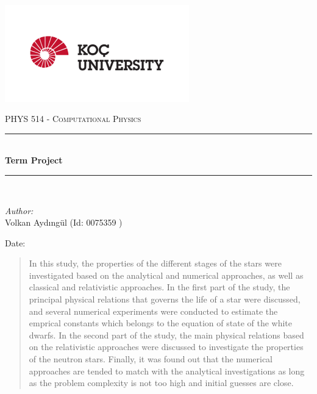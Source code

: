 \documentclass[letterpaper,12pt]{article}
\newcommand{\reporttitle}{Term Project}
\newcommand{\reportauthor}{ Volkan Aydıngül (Id: 0075359 )\\
                            }
\begin{document}
\begin{titlepage}
\newcommand{\HRule}{\rule{0.7\linewidth}{0.5mm}}
\begin{center} %
\includegraphics[width = 8cm]{figures/koc_logo.png}

\textsc{\Large PHYS 514 - Computational Physics}\\[1.5cm] 
\HRule \\[0.6cm]
{ \huge \bfseries \reporttitle}\\ %
\HRule \\[1.5cm]
\end{center}
\vspace{2cm}
\begin{flushleft} \large
\textit{Author:}\\
\reportauthor%
\end{flushleft}
\vspace{2cm}
\makeatletter
Date: \@date 
\vfill %
\makeatother
\end{titlepage}




\tableofcontents
\newpage







\begin{abstract}
    In this study, the properties of the different stages of the stars were investigated based on the analytical and numerical approaches, as well as classical and relativistic approaches. In the first part of the study, the principal physical relations that governs the life of a star were discussed, and several numerical experiments were conducted to estimate the emprical constants which belongs to the equation of state of the white dwarfs. In the second part of the study, the main physical relations based on the relativistic approaches were discussed to investigate the properties of the neutron stars. Finally, it was found out that the numerical approaches are tended to match with the analytical investigations as long as the problem complexity is not too high and initial guesses are close.
\end{abstract}
\end{document}
